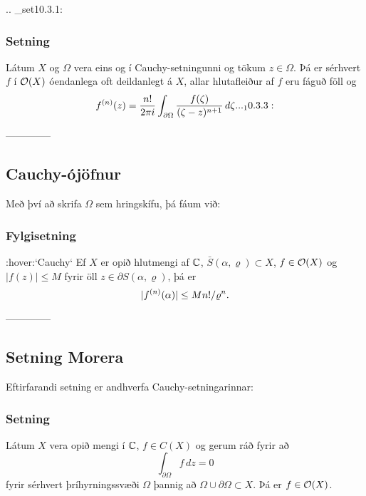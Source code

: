 .. _set10.3.1:

\subsubsection{Setning}  
Látum $X$ og $\Omega$ vera eins og í Cauchy-setningunni
og tökum $z\in \Omega$.  Þá er sérhvert $f$ í ${\cal O}(X)$
óendanlega oft deildanlegt á $X$, allar hlutafleiður af $f$ eru
fáguð föll og
 \begin{equation*}f\sp{(n)}(z)=
\dfrac {n!}{2\pi i}\int_{\partial\Omega}
\dfrac {f(\zeta)}{(\zeta-z)\sp {n+1}}\, d\zeta.


.. _10.3.3:

 \end{equation*}


--------------




\subsection*{Cauchy-ójöfnur}



Með því að skrifa $\Omega$ sem hringskífu, þá fáum við:

\subsubsection{Fylgisetning} :hover:`Cauchy`  Ef
$X$ er opið hlutmengi af ${\mathbb C}$, $\bar S(\alpha,\varrho)\subset X$,
$f\in {\cal O}(X)$ og $|f(z)|\leq M$ fyrir öll $z\in \partial
S(\alpha,\varrho)$, þá er $$ |f\sp{(n)}(\alpha)|\leq
Mn!/\varrho\sp n. $$


--------------




\subsection*{Setning Morera}


Eftirfarandi setning er andhverfa  Cauchy-setningarinnar: 

\subsubsection{Setning}  
Látum $X$ vera opið mengi í ${\mathbb C}$,  $f\in C(X)$ og
gerum ráð fyrir að  
 $$\int_{\partial\Omega} f\, dz =0
 $$
fyrir sérhvert þríhyrningssvæði $\Omega$ þannig að $\Omega\cup
\partial \Omega\subset X$.  Þá er $f\in {\cal O}(X)$.


